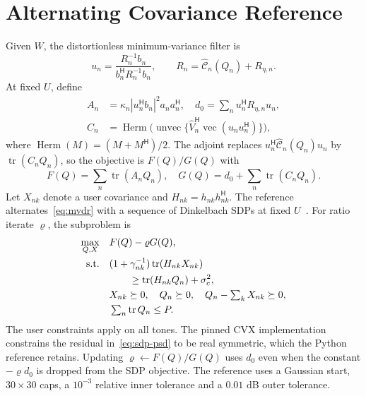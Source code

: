 \documentclass[journal]{IEEEtran}
\DeclareMathOperator{\tr}{tr}
\DeclareMathOperator{\vecop}{vec}
\DeclareMathOperator{\unvec}{unvec}
\DeclareMathOperator{\Herm}{Herm}
\newcommand{\HH}{^{\mathsf H}}
\begin{document}
\section{Alternating Covariance Reference}
Given \(W\), the distortionless minimum-variance filter is
\begin{equation}
 u_n=\frac{R_n^{-1}b_n}{b_n\HH R_n^{-1}b_n},\qquad
 R_n=\widehat{\mathcal C}_n(Q_n)+R_{\eta,n}.
 \label{eq:mvdr}
\end{equation}
At fixed \(U\), define
\begin{equation}
\begin{aligned}
 A_n&=\kappa_n|u_n\HH b_n|^2a_na_n\HH,\quad
 d_0=\sum_n u_n\HH R_{\eta,n}u_n,\\
 C_n&=\Herm\bigl(\unvec\{\widehat V_n\HH\vecop(u_nu_n\HH)\}\bigr),
\end{aligned}
\end{equation}
where \(\Herm(M)=(M+M\HH)/2\). The adjoint replaces \(u_n\HH\widehat{\mathcal C}_n(Q_n)u_n\) by \(\tr(C_nQ_n)\), so the objective is \(F(Q)/G(Q)\) with
\begin{equation}
 F(Q)=\sum_n\tr(A_nQ_n),\quad G(Q)=d_0+\sum_n\tr(C_nQ_n).
 \label{eq:fg}
\end{equation}
Let \(X_{nk}\) denote a user covariance and \(H_{nk}=h_{nk}h_{nk}\HH\). The reference alternates~\eqref{eq:mvdr} with a sequence of Dinkelbach SDPs at fixed \(U\)~\cite{liu2026clutter,dinkelbach}. For ratio iterate \(\varrho\), the subproblem is
\begin{subequations}\label{eq:sdp}
\begin{align}
 \max_{Q,X}\quad &F(Q)-\varrho G(Q),\\
 \text{s.t.}\quad &
 (1+\gamma_{nk}^{-1})\tr(H_{nk}X_{nk}) \notag\\
 &\qquad {}\ge \tr(H_{nk}Q_n)+\sigma_c^2,\\
 &X_{nk}\succeq0,\quad Q_n\succeq0,\quad
   Q_n-\textstyle\sum_k X_{nk}\succeq0, \label{eq:sdp-psd}\\
 &\textstyle\sum_n\tr Q_n\le P . \label{eq:sdp-power}
\end{align}
\end{subequations}
The user constraints apply on all tones. The pinned CVX implementation constrains the residual in~\eqref{eq:sdp-psd} to be real symmetric, which the Python reference retains. Updating \(\varrho\gets F(Q)/G(Q)\) uses \(d_0\) even when the constant \(-\varrho d_0\) is dropped from the SDP objective. The reference uses a Gaussian start, \(30\times30\) caps, a \(10^{-3}\) relative inner tolerance and a \(0.01\) dB outer tolerance.
\end{document}
